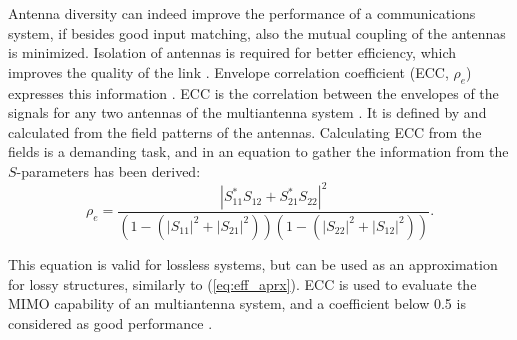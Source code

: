 Antenna diversity can indeed improve the performance of a communications system, if besides good input matching, also the mutual coupling of the antennas is minimized. Isolation of antennas is required for better efficiency, which improves the quality of the link \cite{high_order_mimo}. Envelope correlation coefficient (ECC, $\rho_e$) expresses this information \cite{ecc_paper,mimo_sibille}. ECC is the correlation between the envelopes of the signals for any two antennas of the multiantenna system \cite{mimo_sibille, high_order_mimo}. It is defined by and calculated from the field patterns of the antennas. Calculating ECC from the fields is a demanding task, and in \cite{ecc_paper} an equation to gather the information from the $S$-parameters has been derived:
\begin{equation}
\label{eq:ecc}
    \rho_e = \frac{|S_{11}^*S_{12}+S_{21}^*S_{22}|^2}{(1-(|S_{11}|^2+|S_{21}|^2))(1-(|S_{22}|^2+|S_{12}|^2))}.
\end{equation}

This equation is valid for lossless systems, but can be used as an approximation for lossy structures, similarly to (\ref{eq:eff_aprx}). ECC is used to evaluate the MIMO capability of an multiantenna system, and a coefficient below 0.5 is considered as good performance \cite{reduce_ecc,reduce_ecc2}.


\clearpage